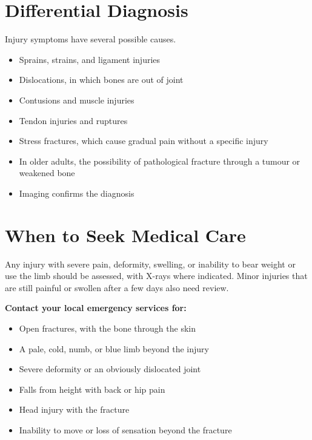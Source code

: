 \section*{Differential Diagnosis}
Injury symptoms have several possible causes.
\begin{itemize}
    \item Sprains, strains, and ligament injuries
    \item Dislocations, in which bones are out of joint
    \item Contusions and muscle injuries
    \item Tendon injuries and ruptures
    \item Stress fractures, which cause gradual pain without a specific injury
    \item In older adults, the possibility of pathological fracture through a tumour or weakened bone
    \item Imaging confirms the diagnosis
\end{itemize}

\section*{When to Seek Medical Care}
Any injury with severe pain, deformity, swelling, or inability to bear weight or use the limb should be assessed, with X-rays where indicated. Minor injuries that are still painful or swollen after a few days also need review.

\textbf{Contact your local emergency services for:}
\begin{itemize}
    \item Open fractures, with the bone through the skin
    \item A pale, cold, numb, or blue limb beyond the injury
    \item Severe deformity or an obviously dislocated joint
    \item Falls from height with back or hip pain
    \item Head injury with the fracture
    \item Inability to move or loss of sensation beyond the fracture
\end{itemize}

